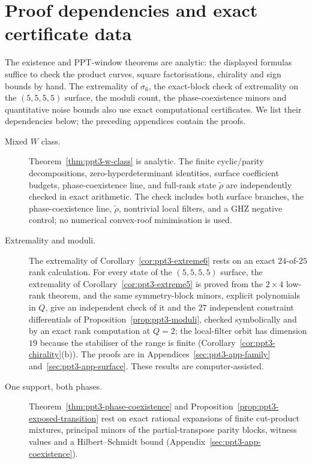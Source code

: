 \section{Proof dependencies and exact certificate data}\label{sec:ppt3-verifiers}

The existence and PPT-window theorems are analytic: the displayed formulas suffice to check the product curves,
square factorisations, chirality and sign bounds by hand. The extremality of $\sigma_6$, the exact-block check of extremality on the $(5,5,5,5)$ surface, the moduli count, the phase-coexistence minors and quantitative noise bounds
also use exact computational certificates. We list their dependencies below; the preceding appendices contain the proofs.

\begin{description}
\item[Mixed $W$ class.]
Theorem~\ref{thm:ppt3-w-class} is analytic. The finite cyclic/parity decompositions, zero-hyperdeterminant
identities, surface coefficient budgets, phase-coexistence line, and full-rank state $\tilde\rho$ are independently checked in exact arithmetic. The check includes both surface branches,
the phase-coexistence line, $\tilde\rho$, nontrivial local filters, and a GHZ negative control; no numerical convex-roof minimisation is used.

\item[Extremality and moduli.]
The extremality of Corollary~\ref{cor:ppt3-extreme6} rests on an exact $24$-of-$25$ rank calculation. For every state of the
$(5,5,5,5)$ surface, the extremality of Corollary~\ref{cor:ppt3-extreme5} is proved from the $2\times4$ low-rank theorem, and the
same symmetry-block minors, explicit polynomials in $Q$, give an independent check of it and the $27$ independent constraint differentials of
Proposition~\ref{prop:ppt3-moduli}, checked symbolically and by an exact rank
computation at $Q=2$; the local-filter orbit has dimension $19$ because the stabiliser of the range is finite
(Corollary~\ref{cor:ppt3-chirality}(b)). The proofs are in Appendices~\ref{sec:ppt3-app-family} and~\ref{sec:ppt3-app-surface}. These results are computer-assisted.

\item[One support, both phases.]
Theorem~\ref{thm:ppt3-phase-coexistence} and Proposition~\ref{prop:ppt3-exposed-transition} rest on exact rational
expansions of finite cut-product mixtures, principal minors of the partial-transpose parity blocks, witness values and a
Hilbert--Schmidt bound (Appendix~\ref{sec:ppt3-app-coexistence}).


\end{description}

